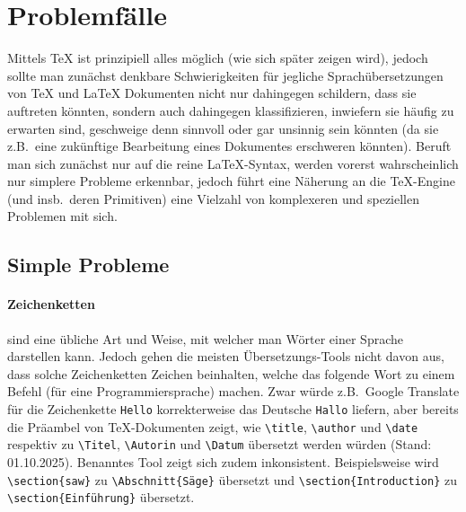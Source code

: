 
\section{Problemfälle}
Mittels \TeX{} ist prinzipiell alles möglich (wie sich später zeigen wird), jedoch sollte man zunächst denkbare Schwierigkeiten für jegliche Sprachübersetzungen von \TeX{} und \LaTeX{} Dokumenten nicht nur dahingegen schildern, dass sie auftreten könnten, sondern auch dahingegen klassifizieren, inwiefern sie häufig zu erwarten sind, geschweige denn sinnvoll oder gar unsinnig sein könnten (da sie z.B.\ eine zukünftige Bearbeitung eines Dokumentes erschweren könnten). Beruft man sich zunächst nur auf die reine \LaTeX{}-Syntax, werden vorerst wahrscheinlich nur simplere Probleme erkennbar, jedoch führt eine Näherung an die \TeX{}-Engine (und insb.\ deren Primitiven) eine Vielzahl von komplexeren und speziellen Problemen mit sich. 

\subsection{Simple Probleme}
\paragraph*{Zeichenketten\label{par:zeichenketten}} sind eine übliche Art und Weise, mit welcher man Wörter einer Sprache darstellen kann. Jedoch gehen die meisten Übersetzungs-Tools nicht davon aus, dass solche Zeichenketten Zeichen beinhalten, welche das folgende Wort zu einem Befehl (für eine Programmiersprache) machen. Zwar würde z.B.\ Google Translate für die Zeichenkette \texttt{Hello} korrekterweise das Deutsche \texttt{Hallo} liefern, aber bereits die Präambel von \TeX{}-Dokumenten zeigt, wie \verb|\title|, \verb|\author| und \verb|\date| respektiv zu \verb|\Titel|, \verb|\Autorin| und \verb|\Datum| übersetzt werden würden (Stand: 01.10.2025). Benanntes Tool zeigt sich zudem inkonsistent. Beispielsweise wird \verb|\section{saw}| zu \verb|\Abschnitt{Säge}| übersetzt und \verb|\section{Introduction}| zu \verb|\section{Einführung}| übersetzt. 

